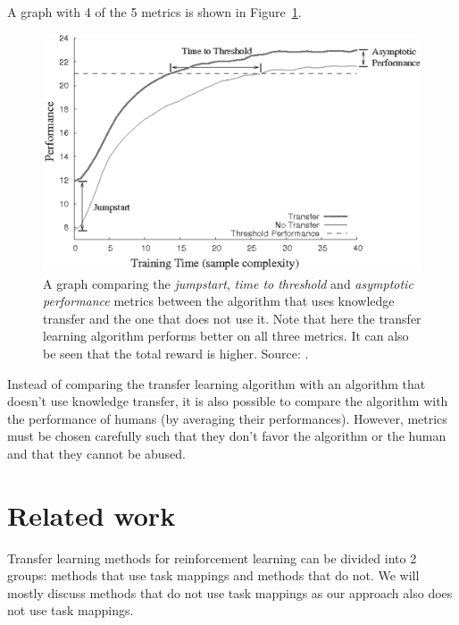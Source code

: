 A graph with 4 of the 5 metrics is shown in Figure~\ref{fig:TLmetrics}.
\begin{figure}[htb]
    \centering
    \includegraphics[width=.9\linewidth]{images/tlmetrics.png}
    \caption[Transfer learning metrics]{A graph comparing the \textit{jumpstart}, \textit{time to threshold} and \textit{asymptotic performance} metrics between the algorithm that uses knowledge transfer and the one that does not use it. Note that here the transfer learning algorithm performs better on all three metrics. It can also be seen that the total reward is higher. Source: \cite{Taylor2009TransferSurvey}.}
    \label{fig:TLmetrics}
\end{figure}
Instead of comparing the transfer learning algorithm with an algorithm that doesn't use knowledge transfer, it is also possible to compare the algorithm with the performance of humans (by averaging their performances).
However, metrics must be chosen carefully such that they don't favor the algorithm or the human and that they cannot be abused.

\section{Related work}




Transfer learning methods for reinforcement learning can be divided into 2 groups: methods that use task mappings and methods that do not.
We will mostly discuss methods that do not use task mappings as our approach also does not use task mappings.\\

